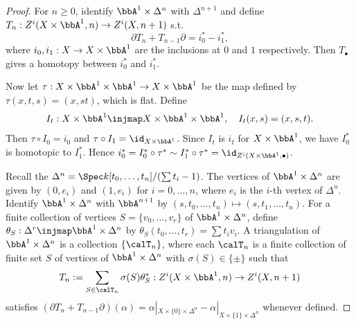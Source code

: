   \begin{proof}
    For $n \geq 0$, identify $\bbA^1 \times \Delta^n$ with $\Delta^{n+1}$ and define $T_n: Z^i(X \times \bbA^1, n) \to Z^i(X, n+1)$ s.t. 
    \[ \partial T_n + T_{n-1} \partial = i_0^* - i_1^*, \]
    where $i_0, i_1: X \to X \times \bbA^1$ are the inclusions at $0$ and $1$ respectively. 
    Then $T_\bullet$ gives a homotopy between $i_0^*$ and $i_1^*$.

    Now let $\tau: X \times \bbA^1 \times \bbA^1 \to X \times \bbA^1$ be the map defined by $\tau(x, t, s) = (x, st)$, which is flat.
    Define 
    \[ I_t: X \times \bbA^1 \injmap X \times \bbA^1 \times \bbA^1, \quad I_t(x, s) = (x, s, t). \]
    Then $\tau \circ I_0 = i_0$ and $\tau \circ I_1 = \id_{X \times \bbA^1}$.
    Since $I_t$ is $i_t$ for $X \times \bbA^1$, we have $I_0^*$ is homotopic to $I_1^*$.
    Hence $i_0^* = I_0^* \circ \tau^* \sim I_1^* \circ \tau^* = \id_{Z^i(X \times \bbA^1, \bullet)}$.


    Recall the $\Delta^n = \Spec k[t_0, \dots, t_n]/(\sum t_i - 1)$.
    The vertices of $\bbA^1 \times \Delta^n$ are given by $(0, e_i)$ and $(1, e_i)$ for $i = 0, \dots, n$, where $e_i$ is the $i$-th vertex of $\Delta^n$.
    Identify $\bbA^1 \times \Delta^n$ with $\bbA^{n+1}$ by $(s, t_0, \dots, t_n) \mapsto (s, t_1, \dots, t_n)$.
    For a finite collection of vertices $S=\{v_0, \dots, v_r\}$ of $\bbA^1 \times \Delta^n$, define $\theta_S: \Delta^r \injmap \bbA^1 \times \Delta^n$ by $\theta_S(t_0, \dots, t_r) = \sum t_i v_i$.
    A triangulation of $\bbA^1 \times \Delta^n$ is a collection $\{\calT_n\}$, where each $\calT_n$ is a finite collection of finite set $S$ of vertices  of $\bbA^1 \times \Delta^n$ with $\sigma(S) \in \{\pm\}$ such that 
    \[ T_n := \sum_{S \in \calT_n} \sigma(S) \theta_S^*: Z^i(X \times \bbA^1, n) \to Z^i(X, n+1) \]
    satisfies $(\partial T_n + T_{n-1} \partial)(\alpha) =  \alpha|_{X\times \{0\} \times \Delta^n} - \alpha|_{X\times \{1\} \times \Delta^n}$ whenever defined.

    \Yang{}
  \end{proof}





